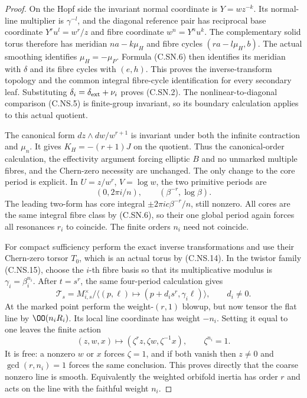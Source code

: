 \begin{proof}
On the Hopf side the invariant normal coordinate
is $Y=wz^{-k}$. Its normal-line multiplier is $\gamma^{-l}$,
and the diagonal reference pair has reciprocal
base coordinate $Y^ru^l=w^r/z$ and fibre coordinate
$w^n=Y^nu^k$. The complementary solid torus
therefore has meridian $n a-k\mu_H$ and fibre
cycles $(r a-l\mu_H,b)$. The actual smoothing
identifies $\mu_H=-\mu_P$. Formula (C.SN.6)
then identifies its meridian with $\delta$
and its fibre cycles with $(e,h)$. This proves
the inverse-transform topology and the common
integral fibre-cycle identification for every
secondary leaf. Substituting
$\delta_i=\delta_{\rm ext}+\nu_i$ proves (C.SN.2).
The nonlinear-to-diagonal comparison (C.NS.5)
is finite-group invariant, so its boundary
calculation applies to this actual quotient.

The canonical form
$dz\wedge dw/w^{r+1}$ is invariant under both
the infinite contraction and $\mu_n$. It gives
$K_H=-(r+1)J$ on the quotient. Thus the
canonical-order calculation, the effectivity
argument forcing elliptic $B$ and no unmarked
multiple fibres, and the Chern-zero necessity
are unchanged. The only change to the core
period is explicit. In $U=z/w^r$, $V=\log w$,
the two primitive periods are
\[
             (0,2\pi i/n),\qquad
             (\beta^{-r},\log\beta).
                                                        \tag{C.SN.7}
\]
The leading two-form has core integral
$\pm2\pi i c\beta^{-r}/n$, still nonzero.
All cores are the same integral fibre class
by (C.SN.6), so their one global period
again forces all resonances $r_i$ to coincide.
The finite orders $n_i$ need not coincide.

For compact sufficiency perform the exact
inverse transformations and use their
Chern-zero torsor $T_0$, which is an actual
torus by (C.NS.14). In the twistor family
(C.NS.15), choose the $i$-th fibre basis
so that its multiplicative modulus is
$\gamma_i=\beta_i^{n_i}$. After $t=s^r$,
the same four-period calculation gives
\[
 \mathcal T_s=M_{i,s}^{\times}/
   \langle(p,\ell)\mapsto
        (p+d_i s^r,\gamma_i\ell)\rangle,\qquad d_i\ne0.
                                                        \tag{C.SN.8}
\]
At the marked point perform the weight-$(r,1)$
blowup, but now tensor the flat line by
$\OO(n_iR_i)$. Its local line coordinate
has weight $-n_i$. Setting it equal to one
leaves the finite action
\[
 (z,w,x)\mapsto
      (\zeta^{r}z,\zeta w,\zeta^{-1}x),
                    \qquad \zeta^{n_i}=1.                \tag{C.SN.9}
\]
It is free: a nonzero $w$ or $x$ forces
$\zeta=1$, and if both vanish then $z\ne0$
and $\gcd(r,n_i)=1$ forces the same conclusion.
This proves directly that the coarse nonzero
line is smooth. Equivalently the weighted
orbifold inertia has order $r$ and acts
on the line with the faithful weight $n_i$.


\end{proof}
